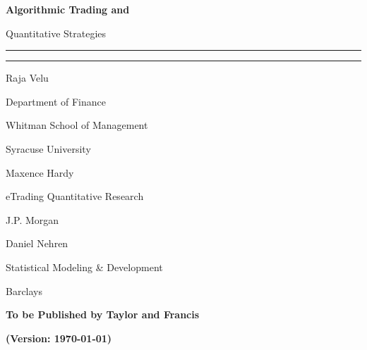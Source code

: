 {\bfseries\Huge Algorithmic Trading and \par Quantitative Strategies}

\noindent\rule{\textwidth}{0.5pt} \par
\vspace{-0.3cm}\noindent\rule{0.25\textwidth}{4pt}


\vspace{0.5cm} 
\begin{minipage}{0.3\textwidth}
\large Raja Velu \par
{\scriptsize
Department of Finance \par
Whitman School of Management \par
Syracuse University \par
}
\end{minipage}%
\begin{minipage}{0.3\textwidth}
\large Maxence Hardy \par
{\scriptsize
eTrading Quantitative Research \par
J.P. Morgan \par
}
\end{minipage}%
\begin{minipage}{0.35\textwidth}
\large Daniel Nehren \par
{\scriptsize
Statistical Modeling \& Development \par 
Barclays \par
}
\end{minipage} \vfill

\begin{center} {\bfseries \Large To be Published by Taylor and Francis} \end{center}

\vfill
\begin{center} \Huge {\bfseries (Version: \today)} \end{center}